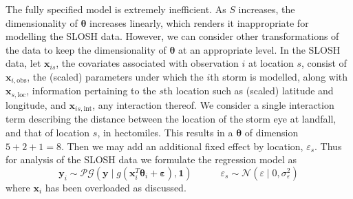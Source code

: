 The fully specified model is extremely inefficient. As $S$ increases, the dimensionality of
    $\bm{\theta}$ increases linearly, which renders it inappropriate for modelling the SLOSH data.  
    However, we can consider other transformations of the data to keep the dimensionality of 
    $\bm{\theta}$ at an appropriate level.
    In the SLOSH data, let $\bm{x}_{is}$, the covariates associated with observation $i$ at location $s$,
    consist of $\bm{x}_{i,\text{obs}}$, the (scaled) parameters under which the $i$th storm is modelled,
    along with $\bm{x}_{s,\text{loc}}$, information pertaining to the $s$th location such as (scaled) 
    latitude and longitude, and $\bm{x}_{is,\text{int}}$, any interaction thereof.  
    We consider a single interaction term describing the distance between the location of the storm eye 
    at landfall, and that of location $s$, in hectomiles. This results in a $\bm{\theta}$ of dimension 
    $5 + 2 + 1 = 8$.  Then we may add an additional fixed effect by location, $\varepsilon_s$.  Thus for 
    analysis of the SLOSH data we formulate the regression model as
    \begin{equation}
        \label{eqn:regressionmodelredux}
        \bm{y}_i \sim 
            \mathcal{PG}\left(\bm{y}\mid g(\bm{x}_i^T\bm{\theta}_i + \bm{\varepsilon}), \bm{1}\right)
            \;\hspace{1cm}\;
            \varepsilon_s \sim \mathcal{N}(\varepsilon \mid 0, \sigma_{\varepsilon}^2)
    \end{equation}
    where $\bm{x}_i$ has been overloaded as discussed.  


    
